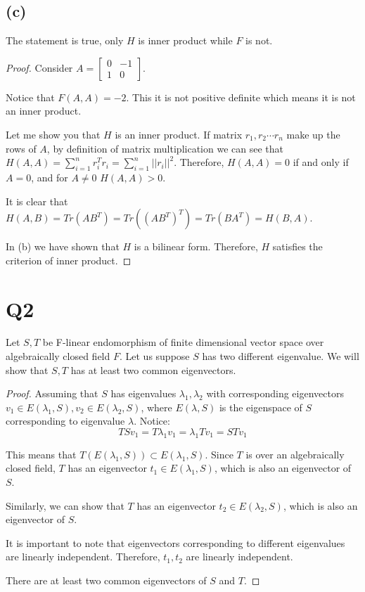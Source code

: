 \documentclass[12pt, a4paper]{article}
\theoremstyle{definition}
\theoremstyle{remark}
\begin{document}
\subsection{(c)}
The statement is true, only $H$ is inner product while $F$ is not.

\begin{proof}
Consider $A = \begin{bmatrix}
0 & -1 \\
1 & 0 
\end{bmatrix}$.

Notice that $F(A,A) = -2$. This it is not positive definite which means it is not an inner product.

Let me show you that $H$ is an inner product. 
If matrix $r_1, r_2 \cdots r_n$ make up the rows of $A$, by definition of matrix multiplication we can see that $H(A,A) = \sum_{i=1}^n r_i^T r_i = \sum_{i=1}^n ||r_i||^2$. Therefore, $H(A, A) = 0$ if and only if $A = 0$, and for $A \neq 0$ $H(A, A) > 0$.

It is clear that $H(A, B) = Tr(AB^T) = Tr((AB^T)^T)= Tr(BA^T) = H(B,A)$. 

In (b) we have shown that $H$ is a bilinear form. 
Therefore, $H$ satisfies the criterion of inner product.
\end{proof}

\section{Q2}
Let $S,T$ be F-linear endomorphism of finite dimensional vector space over algebraically closed field $F$. Let us suppose $S$ has two different eigenvalue. We will show that $S, T$ has at least two common eigenvectors.

\begin{proof}
    Assuming that $S$ has eigenvalues $\lambda_1, \lambda_2$ with corresponding eigenvectors $v_1 \in E(\lambda_1, S), v_2 \in E(\lambda_2, S)$, where $E(\lambda, S)$ is the eigenspace of $S$ corresponding to eigenvalue $\lambda$.
	Notice: 
	\begin{equation}
		TSv_1 = T \lambda_1 v_1 = \lambda_1 Tv_1 = STv_1
	\end{equation}

	This means that $T (E(\lambda_1, S)) \subset E(\lambda_1, S)$. Since $T$ is over an algebraically closed field, $T$ has an eigenvector $t_1 \in E(\lambda_1, S)$, which is also an eigenvector of $S$.

	Similarly, we can show that $T$ has an eigenvector $t_2 \in E(\lambda_2, S)$, which is also an eigenvector of $S$.

	It is important to note that eigenvectors corresponding to different eigenvalues are linearly independent. Therefore, $t_1, t_2$ are linearly independent.

	There are at least two common eigenvectors of $S$ and $T$.
\end{proof}
\end{document}
